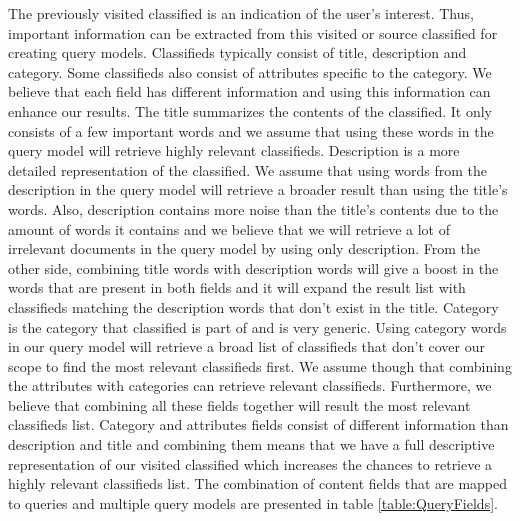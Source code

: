 The previously visited classified is an indication of the user's interest. Thus, important information can be extracted from this visited or source classified for creating query models. Classifieds typically consist of title, description and category. Some classifieds also consist of attributes specific to the category. We believe that each field has different information and using this information can enhance our results. The title summarizes the contents of the classified. It only consists of a few important words and we assume that using these words in the query model will retrieve highly relevant classifieds. Description is a more detailed representation of the classified. We assume that using words from the description in the query model will retrieve a broader result than using the title's words. Also, description contains more noise than the title's contents due to the amount of words it contains and we believe that we will retrieve a lot of irrelevant documents in the query model by using only description. From the other side, combining title words with description words will give a boost in the words that are present in both fields and it will expand the result list with classifieds matching the description words that don't exist in the title. Category is the category that classified is part of and is very generic. Using category words in our query model will retrieve a broad list of classifieds that don't cover our scope to find the most relevant classifieds first. We assume though that combining the attributes with categories can retrieve relevant classifieds. Furthermore, we believe that combining all these fields together will result the most relevant classifieds list. Category and attributes fields consist of different information than description and title and combining them means that we have a full descriptive representation of our visited classified which increases the chances to retrieve a highly relevant classifieds list. The combination of content fields that are mapped to queries and multiple query models are presented in table \ref{table:QueryFields}.


